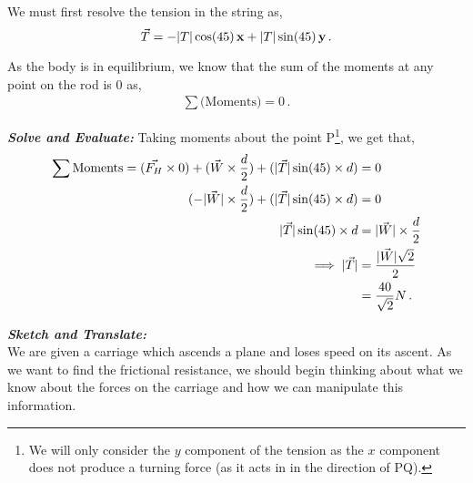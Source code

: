 \begin{subquestions}
\begin{subsubquestions}
We must first resolve the tension in the string as,
\begin{equation}
	\vec{T} = -|T|\cos(45)\,\mathbf{x} + |T|\sin(45)\,\mathbf{y} \,.
\end{equation}

As the body is in equilibrium, we know that the sum of the moments at any point on the rod is 0 as,
\begin{align}
	\sum \text{(Moments)} = 0 \,.
\end{align}




\textbf{\textit{Solve and Evaluate:}}
Taking moments about the point P\footnote{We will only consider the $y$ component of the tension as the $x$ component does not produce a turning force (as it acts in in the direction of PQ).}, we get that,
\begin{align}
	\sum \text{Moments} = (\vec{F_H}\times 0) + (\vec{W} \times \frac{d}{2}) + (|\vec{T}|\sin(45) \times d) & = 0 \nonumber \\
	                                             (-|\vec{W}| \times \frac{d}{2}) + (|\vec{T}|\sin(45) \times d) & = 0 \nonumber \\
	                                                                |\vec{T}|\sin(45) \times d & = |\vec{W}| \times \frac{d}{2} \nonumber \\
	                                                                \implies |\vec{T}| & = \frac{|\vec{W}|\sqrt{2}}{2} \nonumber \\
	                                                                             & = \frac{40}{\sqrt{2}}N \,. 
\end{align}

\end{subsubquestions}


\subquestion

\textbf{\textit{Sketch and Translate:}} \\
We are given a carriage which ascends a plane and loses speed on its ascent. As we want to find the frictional resistance, we should begin thinking about what we know about the forces on the carriage and how we can manipulate this information.\\





\end{subquestions}
